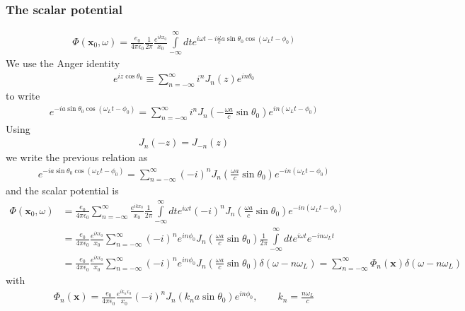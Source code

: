 \subsubsection{The scalar potential}
\begin{align}
    \Phi({\bm x}_0,\omega)=\frac{e_0}{4\pi\epsilon_0}\frac1{2\pi}\frac{e^{ik x_0}}{x_0}\int\limits_{-\infty}^{\infty}dt e^{i\omega t-i\frac{\omega}ca\sin\theta_0\cos(\omega_Lt-\phi_0)}
\end{align}
We use the Anger identity
\begin{align}
    e^{i z \cos \theta_0} \equiv \sum_{n=-\infty}^{\infty} i^n J_n(z) e^{i n \theta_0}
\end{align}
to write
\begin{align}
    e^{-ia\sin\theta_0\cos(\omega_Lt-\phi_0)}=\sum_{n=-\infty}^{\infty} i^n J_n(-\frac{\omega a}c\sin\theta_0) e^{i n (\omega_Lt-\phi_0)}
\end{align}
Using
\begin{align}
    J_n(-z)=J_{-n}(z)
\end{align}
we write the previous relation as
\begin{align}
    e^{-ia\sin\theta_0\cos(\omega_Lt-\phi_0)}=\sum_{n=-\infty}^{\infty} (-i)^n J_n(\frac{\omega a}c\sin\theta_0) e^{-i n (\omega_Lt-\phi_0)}
\end{align}
and the scalar potential is
\begin{align}
    \Phi({\bm x}_0,\omega) & =\frac{e_0}{4\pi\epsilon_0}\sum\limits_{n=-\infty}^{\infty}\frac{e^{ik x_0}}{x_0}\frac1{2\pi}\int\limits_{-\infty}^{\infty}dt e^{i\omega t} (-i)^n J_n(\frac{\omega a}c\sin\theta_0) e^{-i n (\omega_Lt-\phi_0)}\nonumber            \\
                           & =\frac{e_0}{4\pi\epsilon_0}\frac{e^{ik x_0}}{x_0}\sum\limits_{n=-\infty}^{\infty}(-i)^ne^{in\phi_0}J_n(\frac{\omega a}c\sin\theta_0)\frac1{2\pi}\int\limits_{-\infty}^{\infty}dt e^{i\omega t}   e^{-i n \omega_Lt}\nonumber         \\
                           & =\frac{e_0}{4\pi\epsilon_0}\frac{e^{ik x_0}}{x_0}\sum\limits_{n=-\infty}^{\infty}(-i)^ne^{in\phi_0}J_n(\frac{\omega a}c\sin\theta_0)\delta(\omega-n\omega_L)=\sum\limits_{n=-\infty}^{\infty}\Phi_n({\bm x})\delta(\omega-n\omega_L)
\end{align}
with
\begin{align}
    \Phi_n({\bm x})=\frac{e_0}{4\pi\epsilon_0}\frac{e^{ik_n x_0}}{x_0}(-i)^nJ_n(k_na\sin\theta_0)e^{in\phi_0},\qquad k_n=\frac{n\omega_L}c
\end{align}

